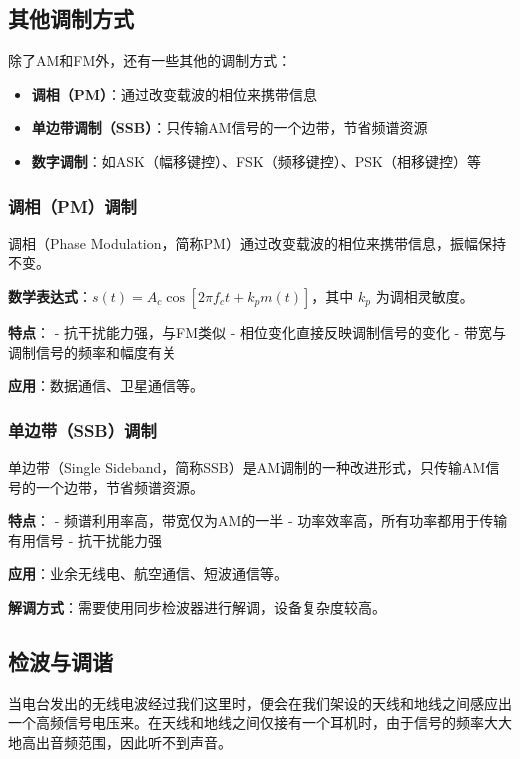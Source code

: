 \documentclass[12pt,UTF8]{ctexbook}
\begin{document}
\subsection{其他调制方式}

除了AM和FM外，还有一些其他的调制方式：

\begin{itemize}[leftmargin=3.5em]
    \item \textbf{调相（PM）}：通过改变载波的相位来携带信息
    \item \textbf{单边带调制（SSB）}：只传输AM信号的一个边带，节省频谱资源
    \item \textbf{数字调制}：如ASK（幅移键控）、FSK（频移键控）、PSK（相移键控）等
\end{itemize}

\subsubsection{调相（PM）调制}

调相（Phase Modulation，简称PM）通过改变载波的相位来携带信息，振幅保持不变。

\textbf{数学表达式}：$s(t) = A_c\cos[2\pi f_c t + k_p m(t)]$，其中 $k_p$ 为调相灵敏度。

\textbf{特点}：
- 抗干扰能力强，与FM类似
- 相位变化直接反映调制信号的变化
- 带宽与调制信号的频率和幅度有关

\textbf{应用}：数据通信、卫星通信等。

\subsubsection{单边带（SSB）调制}

单边带（Single Sideband，简称SSB）是AM调制的一种改进形式，只传输AM信号的一个边带，节省频谱资源。

\textbf{特点}：
- 频谱利用率高，带宽仅为AM的一半
- 功率效率高，所有功率都用于传输有用信号
- 抗干扰能力强

\textbf{应用}：业余无线电、航空通信、短波通信等。

\textbf{解调方式}：需要使用同步检波器进行解调，设备复杂度较高。

\subsection{检波与调谐}

当电台发出的无线电波经过我们这里时，便会在我们架设的天线和地线之间感应出一个高频信号电压来。在天线和地线之间仅接有一个耳机时，由于信号的频率大大地高出音频范围，因此听不到声音。
\end{document}
